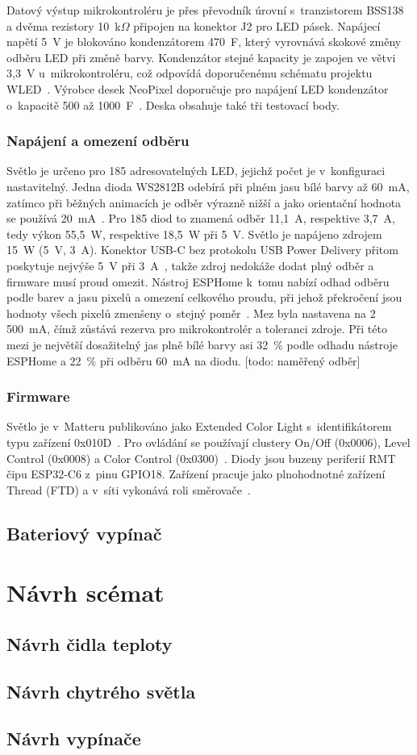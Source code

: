 Datový výstup mikrokontroléru je přes převodník úrovní s~tranzistorem BSS138
a dvěma rezistory 10~k$\Omega$ připojen na konektor J2 pro LED pásek.
Napájecí napětí 5~V je
blokováno kondenzátorem 470~\textmu F, který vyrovnává skokové změny odběru
LED při změně barvy. Kondenzátor stejné kapacity je zapojen ve větvi 3,3~V
u~mikrokontroléru, což odpovídá doporučenému schématu projektu
WLED~\cite{wled-wiring}. Výrobce desek NeoPixel doporučuje pro napájení
LED kondenzátor o~kapacitě 500 až 1000~\textmu F~\cite{adafruit-neopixel}.
Deska obsahuje také tři testovací body.

\subsubsection{Napájení a omezení odběru}

Světlo je určeno pro 185 adresovatelných LED, jejichž počet je v~konfiguraci
nastavitelný. Jedna dioda WS2812B odebírá při plném jasu bílé barvy až
60~mA, zatímco při běžných animacích je odběr výrazně nižší a jako orientační
hodnota se používá 20~mA~\cite{adafruit-neopixel}. Pro 185 diod to znamená
odběr 11,1~A, respektive 3,7~A, tedy výkon 55,5~W, respektive 18,5~W při 5~V.
Světlo je napájeno zdrojem 15~W (5~V, 3~A). Konektor USB-C bez protokolu
USB Power Delivery přitom poskytuje nejvýše 5~V při 3~A~\cite{ti-usb-type-c},
takže zdroj nedokáže dodat plný odběr a firmware musí proud omezit. Nástroj
ESPHome k~tomu nabízí odhad odběru podle barev a jasu pixelů a omezení
celkového proudu, při jehož překročení jsou hodnoty všech pixelů zmenšeny
o~stejný poměr~\cite{esphome-light}. Mez byla nastavena na 2\,500~mA, čímž
zůstává rezerva pro mikrokontrolér a toleranci zdroje. Při této mezi je
největší dosažitelný jas plně bílé barvy asi 32~\% podle odhadu nástroje
ESPHome a 22~\% při odběru 60~mA na diodu. [todo: naměřený odběr]

\subsubsection{Firmware}

Světlo je v~Matteru publikováno jako Extended Color Light s~identifikátorem
typu zařízení 0x010D~\cite{espressif-arduino-matter-light}. Pro ovládání se
používají clustery On/Off (0x0006), Level Control (0x0008) a Color Control
(0x0300)~\cite{csa-matter}. Diody jsou buzeny periferií RMT čipu ESP32-C6
z~pinu GPIO18. Zařízení pracuje jako plnohodnotné zařízení Thread (FTD)
a v~síti vykonává roli směrovače~\cite{esphome-openthread}.
\subsection{Bateriový vypínač}

\section{Návrh scémat}
\subsection{Návrh čidla teploty}
\subsection{Návrh chytrého světla}
\subsection{Návrh vypínače}
